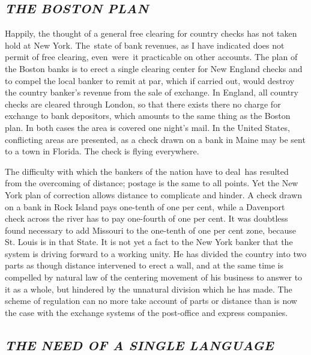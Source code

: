\documentclass[openany,nobib]{tufte-book}
\begin{document}
\hypertarget{the-boston-plan}{%
\subsection{\texorpdfstring{\emph{THE BOSTON
PLAN}}{THE BOSTON PLAN}}\label{the-boston-plan}}

Happily, the thought of a general free clearing for country checks has
not taken hold at New York. The~state of bank revenues, as I have
indicated does not permit of free clearing, even~were~it practicable on
other accounts. The plan of the Boston banks is to erect a single
clearing center for New England checks and to compel the local banker to
remit at par, which if carried out, would destroy the country banker's
revenue from the sale of exchange. In England, all country checks are
cleared through London, so that there exists there no charge for
exchange to bank depositors, which amounts to the same thing as the
Boston plan. In both cases the area is covered one night's mail. In the
United States, conflicting areas are presented, as a check drawn on a
bank in Maine may be sent to a town in Florida. The check is flying
everywhere.~

The difficulty with which the bankers of the nation have to deal~has
resulted from the overcoming of distance; postage is the same to all
points. Yet the New York plan of correction allows distance to
complicate and hinder. A check drawn on a bank in Rock Island pays
one-tenth of one per cent, while a Davenport check across the river has
to pay one-fourth of one per cent. It was doubtless found necessary to
add Missouri to the one-tenth of one per cent zone, because St. Louis is
in that State. It is not yet a fact to the New York banker that the
system is driving forward to a working unity. He has divided the country
into two parts as though distance intervened to erect a wall, and at the
same time is compelled by natural law of the centering movement of his
business to answer to it as a whole, but hindered by the unnatural
division which he has made. The scheme of regulation can no more take
account of parts or distance than is now the case with the exchange
systems of the post-office and express companies.~

\hypertarget{the-need-of-a-single-language}{%
\subsection{\texorpdfstring{\emph{THE NEED OF A SINGLE
LANGUAGE}}{THE NEED OF A SINGLE LANGUAGE}}\label{the-need-of-a-single-language}}
\end{document}
